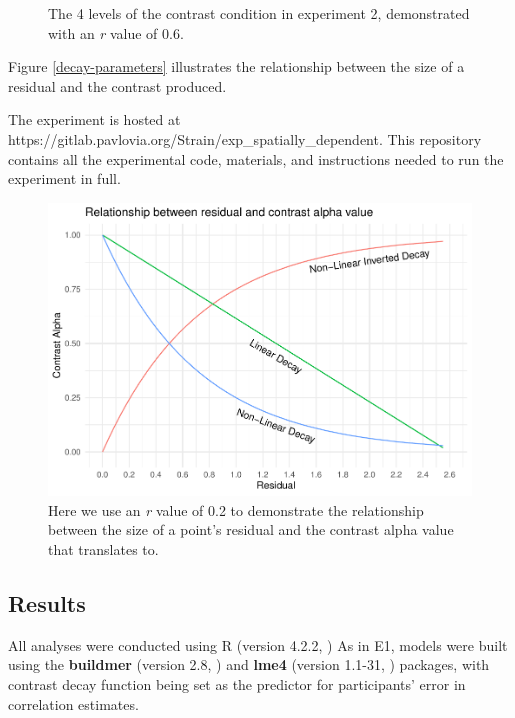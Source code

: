 \documentclass[preprint, 3p,
authoryear]{elsarticle} %
\begin{document}
\begin{figure}
\caption{\label{e2-example-plots}The 4 levels of the contrast condition in experiment 2, demonstrated with an \textit{r} value of 0.6.}\label{fig:e2-example-plots}
\end{figure}

Figure \ref{decay-parameters} illustrates the relationship between the
size of a residual and the contrast produced.

The experiment is hosted at
https://gitlab.pavlovia.org/Strain/exp\_spatially\_dependent. This
repository contains all the experimental code, materials, and
instructions needed to run the experiment in full.

\begin{figure}
\includegraphics[width=1\linewidth]{contrast_and_scatterplots_files/figure-latex/decay-parameters-1} \caption{\label{decay-parameters}Here we use an \textit{r} value of 0.2 to demonstrate the relationship between the size of a point's residual and the contrast alpha value that translates to.}\label{fig:decay-parameters}
\end{figure}

\hypertarget{results-1}{%
\subsection{Results}\label{results-1}}

All analyses were conducted using R (version 4.2.2, \citealp{r_core}) As
in E1, models were built using the \textbf{buildmer} (version 2.8,
\citealp{voeten_buildmer_2022}) and \textbf{lme4} (version 1.1-31,
\citealp{bates_lme4_2015}) packages, with contrast decay function being
set as the predictor for participants' error in correlation estimates.
\end{document}
